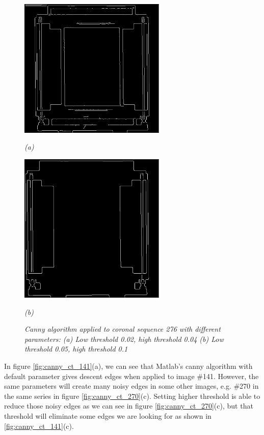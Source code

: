 \begin{figure}[htb]
  \begin{minipage}[b]{2.75in}
    \centering
    \centerline{\mbox{\includegraphics[width=2.75in]{data_extraction/images/canny/0.02_0.04/20121017_276.eps}}}
    \centerline{\emph{(a)}}
  \end{minipage}\medskip
  \begin{minipage}[b]{2.75in}
    \centering
    \centerline{\mbox{\includegraphics[width=2.75in]{data_extraction/images/canny/0.05_0.1/20121017_276.eps}}}
    \centerline{\emph{(b)}}
  \end{minipage}
  \caption{\emph{Canny algorithm applied to coronal sequence 276 with different parameters: (a) Low threshold 0.02, high threshold 0.04 (b) Low threshold 0.05, high threshold 0.1}} \label{fig:canny_ct_276}
\end{figure}

In figure \ref{fig:canny_ct_141}(a), we can see that Matlab's canny algorithm with default parameter gives 
descent edges when applied to image \#141. However, the same parameters will create many noisy edges in some other
images, e.g. \#270 in the same series in figure \ref{fig:canny_ct_270}(c). Setting higher threshold is able to
reduce those noisy edges as we can see in figure \ref{fig:canny_ct_270}(c), but that threshold will eliminate
some edges we are looking for as shown in \ref{fig:canny_ct_141}(c). 

